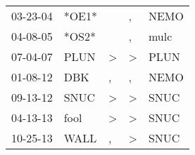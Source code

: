 \begin{supertabular}{lllll}
 03-23-04 &  *OE1* &               &             , &  NEMO \\
 04-08-05 &  *OS2* &               &             , &  mulc \\
 07-04-07 &   PLUN &  \textgreater &  \textgreater &  PLUN \\
 01-08-12 &    DBK &             , &             , &  NEMO \\
 09-13-12 &   SNUC &  \textgreater &  \textgreater &  SNUC \\
 04-13-13 &   fool &  \textgreater &  \textgreater &  SNUC \\
 10-25-13 &   WALL &             , &  \textgreater &  SNUC \\
\end{supertabular}
